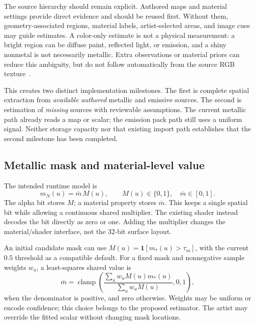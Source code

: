 \documentclass[11pt,letterpaper]{article}
\newcommand{\clamp}{\operatorname{clamp}}
\begin{document}
The source hierarchy should remain explicit. Authored maps and material settings provide direct evidence and should be reused first. Without them, geometry-associated regions, material labels, artist-selected areas, and image cues may guide estimates. A color-only estimate is not a physical measurement: a bright region can be diffuse paint, reflected light, or emission, and a shiny nonmetal is not necessarily metallic. Extra observations or material priors can reduce this ambiguity, but do not follow automatically from the source RGB texture~\cite{barron2015,gltf2}.

This creates two distinct implementation milestones. The first is complete spatial extraction from \emph{available authored} metallic and emissive sources. The second is estimation of \emph{missing} sources with reviewable assumptions. The current metallic path already reads a map or scalar; the emission pack path still uses a uniform signal. Neither storage capacity nor that existing import path establishes that the second milestone has been completed.

\subsection{Metallic mask and material-level value}
The intended runtime model is
\begin{equation}
 m_N(u)=\overline m\,M(u),\qquad M(u)\in\{0,1\},\quad
 \overline m\in[0,1].
\label{eq:metalmodel}
\end{equation}
The alpha bit stores $M$; a material property stores $\overline m$. This keeps a single spatial bit while allowing a continuous shared multiplier. The existing shader instead decodes the bit directly as zero or one. Adding the multiplier changes the material/shader interface, not the 32-bit surface layout.

An initial candidate mask can use $M(u)=\mathbf1[m_*(u)>\tau_m]$, with the current $0.5$ threshold as a compatible default. For a fixed mask and nonnegative sample weights $w_u$, a least-squares shared value is
\begin{equation}
\overline m=\clamp\!\left(
\frac{\sum_u w_u M(u)m_*(u)}{\sum_u w_u M(u)},0,1\right),
\label{eq:metalfit}
\end{equation}
when the denominator is positive, and zero otherwise. Weights may be uniform or encode confidence; this choice belongs to the proposed estimator. The artist may override the fitted scalar without changing mask locations.
\end{document}
